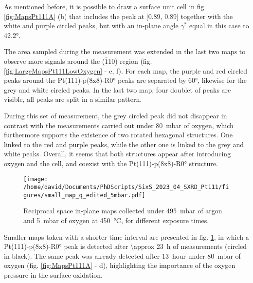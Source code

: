 As mentioned before, it is possible to draw a surface unit cell in fig. \ref{fig:MapsPt111A} (b) that includes the peak at [0.89, 0.89] together with the white and purple circled peaks, but with an in-plane angle $\gamma^*$ equal in this case to \ang{42.2}.

The area sampled during the measurement was extended in the last two maps to observe more signals around the ($\bar{1}10$) region (fig. \ref{fig:LargeMapsPt111LowOxygen} - e, f).
For each map, the purple and red circled peaks around the Pt(111)-p(8x8)-R\ang{0} peaks are separated by \ang{60}, likewise for the grey and white circled peaks.
In the last two map, four doublet of peaks are visible, all peaks are split in a similar pattern.

During this set of measurement, the grey circled peak did not disappear in contrast with the measurements carried out under \qty{80}{\milli\bar} of oxygen, which furthermore supports the existence of two rotated hexagonal structures.
One linked to the red and purple peaks, while the other one is linked to the grey and white peaks.
Overall, it seems that both structures appear after introducing oxygen and the cell, and coexist with the Pt(111)-p(8x8)-R\ang{0} structure.

\begin{figure}[!htb]
    \centering
    \texttt{[image: /home/david/Documents/PhDScripts/SixS\_2023\_04\_SXRD\_Pt111/figures/small\_map\_q\_edited\_5mbar.pdf]}
    \caption{
        Reciprocal space in-plane maps collected under \qty{495}{\milli\bar} of argon and \qty{5}{\milli\bar} of oxygen at \qty{450}{\degreeCelsius}, for different exposure times.
    }
    \label{fig:SmallMapsPt111LowOxygen}
\end{figure}

Smaller maps taken with a shorter time interval are presented in fig. \ref{fig:SmallMapsPt111LowOxygen}, in which a Pt(111)-p(8x8)-R\ang{0} peak is detected after \qty{\approx 23}{\hour} of measurements (circled in black).
The same peak was already detected after \qty{13}{hour} under \qty{80}{\milli\bar} of oxygen (fig. \ref{fig:MapsPt111A} - d), highlighting the importance of the oxygen pressure in the surface oxidation.

